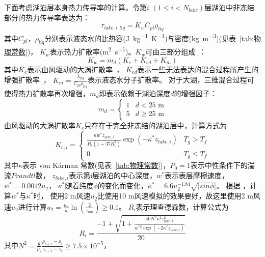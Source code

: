 下面考虑湖泊层本身热力传导率的计算。令第$i$ $\left(1\leqslant i<N_{lake}\right)$层湖泊中非冻结部分的热力传导率表达为：
\begin{equation}
\tau_{lake, i, liq}=K_{w} C_{p l} \rho_{liq}
\end{equation}
其中$C_{pl}$，$\rho_{liq}$分别表示液态水的比热容(\unit{J.kg^{-1}.K^{-1}})与密度(\unit{kg.m^{-3}})(见表~\ref{tab:物理常数})，
$K_w$表示热力扩散率(\unit{m^2.s^{-1}})。$K_w$可由三部分组成~\citep{subin2012improved}：
\begin{equation}
K_{w}=m_{d}\left(K_{e}+K_{ed}+K_{m}\right)
\end{equation}
其中$K_e$表示由风驱动的大涡扩散率~\citep{hostetler1990simulation}，
$K_{ed}$表示一些无法表达的混合过程所产生的增强扩散率~\citep{fang1996long}，
$K_m=\frac{\lambda_{liq}}{C_{pl}\rho_{liq}}$表示液态水分子扩散率。
对于大湖，三维混合过程可使得热力扩散率再次增强，$m_d$即表示依赖于湖泊深度$d$的增强因子：
\begin{equation}
m_{d}=\left\{\begin{array}{ll}1 & d<25 \text{ m} \\ 5 & d \geqslant 25 \text{ m}\end{array}\right.
\end{equation}
由风驱动的大涡扩散率$K_e$只存在于完全非冻结的湖泊层中，计算方式为
\begin{equation}
K_{e, i}=\begin{cases}
\frac{\kappa w^\ast z_{lake, i}}{P_{0}\left(1+37 R_{i}^{2}\right)} 
    \exp \left(-\kappa^{*} z_{lake, i}\right) & T_{g}>T_{f} \\
0 & T_{g} \leqslant T_{f}
\end{cases}
\end{equation}
其中$\kappa$表示 von K\'arman 常数(见表~\ref{tab:物理常数})，$P_0=1$表示中性条件下的湍流$Prandtl$数，
$z_{lake,i}$表示第i层湖泊的中心深度，$w^\ast$表示表层摩擦速度，$w^\ast=0.0012u_2$，
$\kappa^\ast$随着纬度$\phi$的变化而变化，$\kappa^\ast=6.6u_2^{-1.84}\sqrt{\left|sin\phi\right|}$。
根据 \citet{hostetler1990simulation}，计算$w^\ast$与$\kappa^\ast$时，
使用2 m风速$u_2$比使用10 m风速模拟的效果要好，故这里使用2 m风速$u_2$进行计算$u_2=\frac{u_\ast}{\kappa}\ln{\left(\frac{2}{z_{0m}}\right)}\geqslant 0.1$。
$R_i$表示理查德森数，计算公式为
\begin{equation}
R_{i}=\frac{-1+\sqrt{\left.1+\frac{40 N^{2} \kappa^{2} z_{lake, i}^{2}}{w^{\ast 2} \exp \left(-2 \kappa^{\ast} z_{lake, i}\right)}\right.}}{20}
\end{equation}
其中$N^2=\frac{g}{\rho_i}\frac{\rho_{i+1}-\rho_i}{z_{i+1}-z_i}\geqslant 7.5\times{10}^{-5}$，
